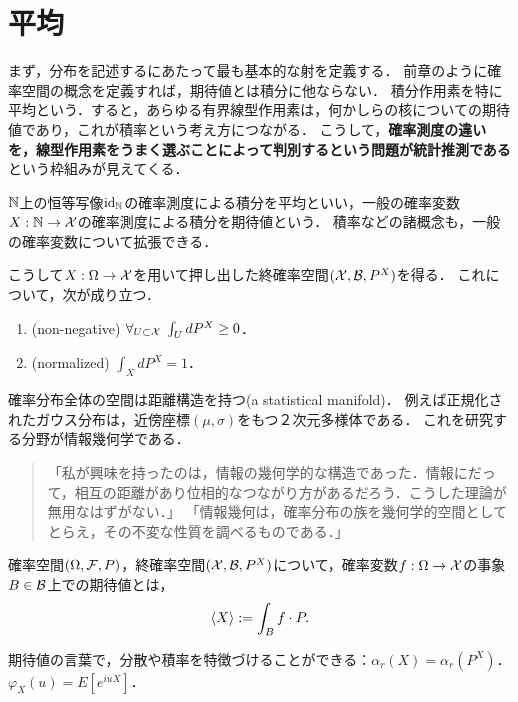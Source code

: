\documentclass[uplatex,dvipdfmx]{jsreport}
\begin{document}
\section{平均}

\begin{tcolorbox}[colframe=ForestGreen, colback=ForestGreen!10!white,breakable,colbacktitle=ForestGreen!40!white,coltitle=black,fonttitle=\bfseries\sffamily,
title=まさか，確率空間とは構造の入った多様体か．「観測」と「座標変換」の構造を持つ，極めて幾何的なsetupである．]
    まず，分布を記述するにあたって最も基本的な射を定義する．
    前章のように確率空間の概念を定義すれば，期待値とは積分に他ならない．
    積分作用素を特に平均という．すると，あらゆる有界線型作用素は，何かしらの核についての期待値であり，これが積率という考え方につながる．
    こうして，\textbf{確率測度の違いを，線型作用素をうまく選ぶことによって判別するという問題が統計推測である}という枠組みが見えてくる．

    $\mathbb{N}$上の恒等写像$\mathrm{id}_{\mathbb{N}}$の確率測度による積分を平均といい，一般の確率変数$X:\mathbb{N}\to\mathcal{X}$の確率測度による積分を期待値という．
    積率などの諸概念も，一般の確率変数について拡張できる．
\end{tcolorbox}

\begin{lemma}[確率分布の特徴付け]
    こうして$X:\Omega\to\mathcal{X}$を用いて押し出した終確率空間$(\mathcal{X},\mathcal{B},P^X)$を得る．
    これについて，次が成り立つ．
    \begin{enumerate}
        \item (non-negative) $\forall_{U\subset\mathcal{X}}\;\int_UdP^X\ge 0$．
        \item (normalized) $\int_XdP^X=1$．
    \end{enumerate}
\end{lemma}
\begin{remarks}
    確率分布全体の空間は距離構造を持つ(a statistical manifold)．
    例えば正規化されたガウス分布は，近傍座標$(\mu,\sigma)$をもつ２次元多様体である．
    これを研究する分野が情報幾何学である．
    \begin{quote}
        「私が興味を持ったのは，情報の幾何学的な構造であった．情報にだって，相互の距離があり位相的なつながり方があるだろう．こうした理論が無用なはずがない．」
        「情報幾何は，確率分布の族を幾何学的空間としてとらえ，その不変な性質を調べるものである．」
    \end{quote}
\end{remarks}

\begin{definition}
    確率空間$(\Omega,\mathcal{F},P)$，終確率空間$(\mathcal{X},\mathcal{B},P^X)$について，確率変数$f:\Omega\to\mathcal{X}$の事象$B\in\mathcal{B}$上での期待値とは，
    \[\langle X\rangle:=\int_Bf\cdot P.\]
\end{definition}
\begin{remark}
    期待値の言葉で，分散や積率を特徴づけることができる：$\alpha_r(X)=\alpha_r(P^X)$．
    $\varphi_X(u)=E[e^{iuX}]$．
\end{remark}
\end{document}
